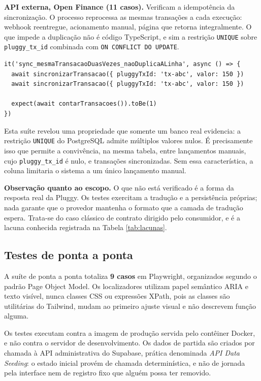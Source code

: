 \documentclass[12pt,a4paper]{article}
\begin{document}
\textbf{API externa, Open Finance (11 casos).} Verificam a idempotência da sincronização. O processo reprocessa as mesmas transações a cada execução: webhook reentregue, acionamento manual, página que retorna integralmente. O que impede a duplicação não é código TypeScript, e sim a restrição \texttt{UNIQUE} sobre \texttt{pluggy\_tx\_id} combinada com \texttt{ON CONFLICT DO UPDATE}.

\begin{lstlisting}[caption={Verificação de idempotência contra o banco real.}]
it('sync_mesmaTransacaoDuasVezes_naoDuplicaALinha', async () => {
  await sincronizarTransacao({ pluggyTxId: 'tx-abc', valor: 150 })
  await sincronizarTransacao({ pluggyTxId: 'tx-abc', valor: 150 })

  expect(await contarTransacoes()).toBe(1)
})
\end{lstlisting}

Esta suíte revelou uma propriedade que somente um banco real evidencia: a restrição \texttt{UNIQUE} do PostgreSQL admite múltiplos valores nulos. É precisamente isso que permite a convivência, na mesma tabela, entre lançamentos manuais, cujo \texttt{pluggy\_tx\_id} é nulo, e transações sincronizadas. Sem essa característica, a coluna limitaria o sistema a um único lançamento manual.

\textbf{Observação quanto ao escopo.} O que não está verificado é a forma da resposta real da Pluggy. Os testes exercitam a tradução e a persistência próprias; nada garante que o provedor mantenha o formato que a camada de tradução espera. Trata-se do caso clássico de contrato dirigido pelo consumidor, e é a lacuna conhecida registrada na Tabela \ref{tab:lacunas}.

\subsection{Testes de ponta a ponta}

A suíte de ponta a ponta totaliza \textbf{9 casos} em Playwright, organizados segundo o padrão Page Object Model. Os localizadores utilizam papel semântico ARIA e texto visível, nunca classes CSS ou expressões XPath, pois as classes são utilitárias do Tailwind, mudam ao primeiro ajuste visual e não descrevem função alguma.

Os testes executam contra a imagem de produção servida pelo contêiner Docker, e não contra o servidor de desenvolvimento. Os dados de partida são criados por chamada à API administrativa do Supabase, prática denominada \textit{API Data Seeding}: o estado inicial provém de chamada determinística, e não de jornada pela interface nem de registro fixo que alguém possa ter removido.
\end{document}
